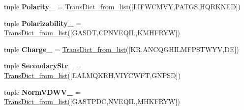 \begin{DoxyCompactItemize}
\item 
\hypertarget{namespacefeat__extract_1_1_a_alphabets_ada5cbb2fef2964a0fa468d69b86503d7}{}tuple {\bfseries Polarity\+\_} = \hyperlink{namespacefeat__extract_1_1_a_alphabets_acdda8523b57175e0e79064c4da723c5d}{Trans\+Dict\+\_\+from\+\_\+list}(\mbox{[}\textquotesingle{}L\+I\+F\+W\+C\+M\+V\+Y\textquotesingle{},\textquotesingle{}P\+A\+T\+G\+S\textquotesingle{},\textquotesingle{}H\+Q\+R\+K\+N\+E\+D\textquotesingle{}\mbox{]})\label{namespacefeat__extract_1_1_a_alphabets_ada5cbb2fef2964a0fa468d69b86503d7}

\item 
\hypertarget{namespacefeat__extract_1_1_a_alphabets_a8ad2fa4207d96310d8363c59b05560a0}{}tuple {\bfseries Polarizability\+\_} = \hyperlink{namespacefeat__extract_1_1_a_alphabets_acdda8523b57175e0e79064c4da723c5d}{Trans\+Dict\+\_\+from\+\_\+list}(\mbox{[}\textquotesingle{}G\+A\+S\+D\+T\textquotesingle{},\textquotesingle{}C\+P\+N\+V\+E\+Q\+I\+L\textquotesingle{},\textquotesingle{}K\+M\+H\+F\+R\+Y\+W\textquotesingle{}\mbox{]})\label{namespacefeat__extract_1_1_a_alphabets_a8ad2fa4207d96310d8363c59b05560a0}

\item 
\hypertarget{namespacefeat__extract_1_1_a_alphabets_a535e11f4a9d772abd94fb1e9174f34a2}{}tuple {\bfseries Charge\+\_} = \hyperlink{namespacefeat__extract_1_1_a_alphabets_acdda8523b57175e0e79064c4da723c5d}{Trans\+Dict\+\_\+from\+\_\+list}(\mbox{[}\textquotesingle{}K\+R\textquotesingle{},\textquotesingle{}A\+N\+C\+Q\+G\+H\+I\+L\+M\+F\+P\+S\+T\+W\+Y\+V\textquotesingle{},\textquotesingle{}D\+E\textquotesingle{}\mbox{]})\label{namespacefeat__extract_1_1_a_alphabets_a535e11f4a9d772abd94fb1e9174f34a2}

\item 
\hypertarget{namespacefeat__extract_1_1_a_alphabets_ab6ef9a49caf6da5250e975d1ec8467bd}{}tuple {\bfseries Secondary\+Str\+\_} = \hyperlink{namespacefeat__extract_1_1_a_alphabets_acdda8523b57175e0e79064c4da723c5d}{Trans\+Dict\+\_\+from\+\_\+list}(\mbox{[}\textquotesingle{}E\+A\+L\+M\+Q\+K\+R\+H\textquotesingle{},\textquotesingle{}V\+I\+Y\+C\+W\+F\+T\textquotesingle{},\textquotesingle{}G\+N\+P\+S\+D\textquotesingle{}\mbox{]})\label{namespacefeat__extract_1_1_a_alphabets_ab6ef9a49caf6da5250e975d1ec8467bd}

\item 
\hypertarget{namespacefeat__extract_1_1_a_alphabets_ab1d8f69be51567b0647f34a7c1d20e16}{}tuple {\bfseries Norm\+V\+D\+W\+V\+\_} = \hyperlink{namespacefeat__extract_1_1_a_alphabets_acdda8523b57175e0e79064c4da723c5d}{Trans\+Dict\+\_\+from\+\_\+list}(\mbox{[}\textquotesingle{}G\+A\+S\+T\+P\+D\+C\textquotesingle{},\textquotesingle{}N\+V\+E\+Q\+I\+L\textquotesingle{},\textquotesingle{}M\+H\+K\+F\+R\+Y\+W\textquotesingle{}\mbox{]})\label{namespacefeat__extract_1_1_a_alphabets_ab1d8f69be51567b0647f34a7c1d20e16}


\end{DoxyCompactItemize}
